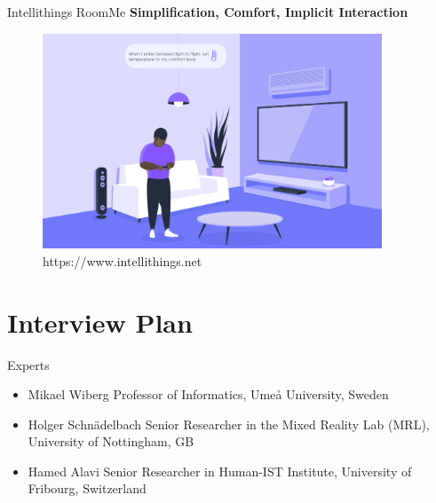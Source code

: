 \documentclass[10pt]{beamer}
\begin{document}
\begin{frame}{Intellithings RoomMe}
	\textbf{Simplification, Comfort, Implicit Interaction}\\
	\vspace{3mm}
	\begin{figure}[H]
	\includegraphics[width=0.9\textwidth]{images/1.png}
	\caption{https://www.intellithings.net}
	\end{figure}
\end{frame}


\section{Interview Plan}


\begin{frame}{Experts}
	\begin{itemize}
        \pause{}
		\item Mikael Wiberg Professor of Informatics, Umeå University, Sweden
		\pause{}
		\item Holger Schnädelbach Senior Researcher in the Mixed Reality Lab (MRL), University of Nottingham, GB
		\pause{}
		\item Hamed Alavi Senior Researcher in Human-IST Institute, University of Fribourg, Switzerland
	\end{itemize}	
\end{frame}

\end{document}

